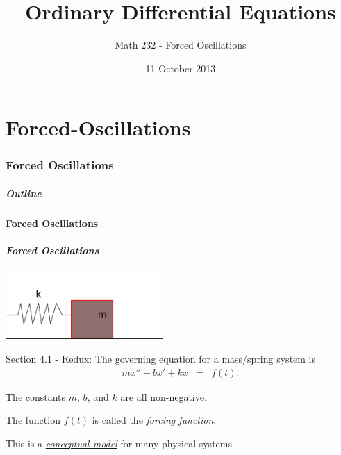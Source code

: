 \part{Forced-Oscillations}
\section{Forced Oscillations}

\title{Ordinary Differential Equations}
\subtitle{Math 232 - Forced Oscillations}
\date{11 October 2013}

\begin{frame}
  \titlepage
\end{frame}

\begin{frame}
  \frametitle{Outline}
  \tableofcontents[ currentsection ]
\end{frame}


\subsection{Forced Oscillations}


\begin{frame}
  \frametitle{Forced Oscillations}

  \includegraphics[width=6cm]{img/springMassStatic}

  Section 4.1 - Redux: The governing equation for a mass/spring system
  is
  \begin{eqnarray*}
    mx'' + bx'+kx & = & f(t).
  \end{eqnarray*}

  The constants $m$, $b$, and $k$ are all non-negative.

  The function $f(t)$ is called the \textit{forcing function}.

  This is a \underline{\textit{conceptual model}} for many physical systems.

\end{frame}


